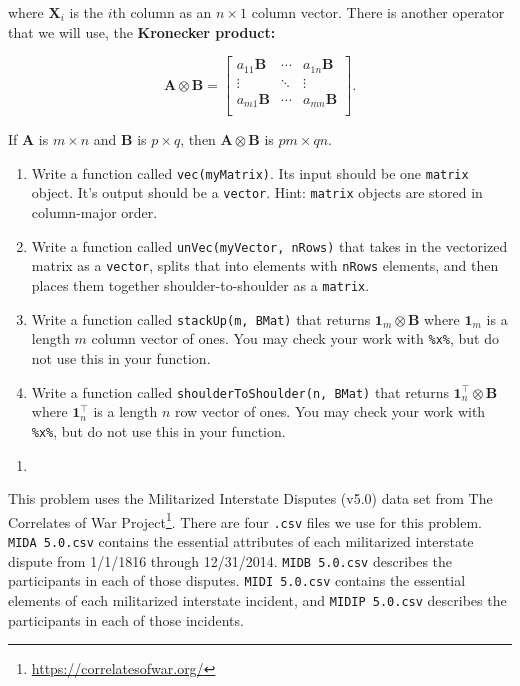 \documentclass[
  12pt,
  krantz2]{krantz}
\providecommand{\tightlist}{%
  \setlength{\itemsep}{0pt}\setlength{\parskip}{0pt}}
\renewcommand{\href}[2]{#2\footnote{\url{#1}}}
\begin{document}
where \(\mathbf{X}_i\) is the \(i\)th column as an \(n \times 1\) column vector. There is another operator that we will use, the \textbf{Kronecker product:}

\begin{equation} 
\mathbf{A} \otimes \mathbf{B} = 
\begin{bmatrix}
a_{11} \mathbf{B} & \cdots & a_{1n} \mathbf{B} \\
\vdots & \ddots & \vdots \\
a_{m1} \mathbf{B} & \cdots & a_{mn} \mathbf{B} \\
\end{bmatrix}.
\end{equation}

If \(\mathbf{A}\) is \(m \times n\) and \(\mathbf{B}\) is \(p \times q\), then \(\mathbf{A} \otimes \mathbf{B}\) is \(pm \times qn\).

\begin{enumerate}
\def\labelenumi{\alph{enumi})}
\tightlist
\item
  Write a function called \texttt{vec(myMatrix)}. Its input should be one \texttt{matrix} object. It's output should be a \texttt{vector}. Hint: \texttt{matrix} objects are stored in column-major order.
\item
  Write a function called \texttt{unVec(myVector,\ nRows)} that takes in the vectorized matrix as a \texttt{vector}, splits that into elements with \texttt{nRows} elements, and then places them together shoulder-to-shoulder as a \texttt{matrix}.
\item
  Write a function called \texttt{stackUp(m,\ BMat)} that returns \(\mathbf{1}_m \otimes \mathbf{B}\) where \(\mathbf{1}_m\) is a length \(m\) column vector of ones. You may check your work with \texttt{\%x\%}, but do not use this in your function.
\item
  Write a function called \texttt{shoulderToShoulder(n,\ BMat)} that returns \(\mathbf{1}^\intercal_n \otimes \mathbf{B}\) where \(\mathbf{1}_n^\intercal\) is a length \(n\) row vector of ones. You may check your work with \texttt{\%x\%}, but do not use this in your function.
\end{enumerate}

\begin{enumerate}
\def\labelenumi{\arabic{enumi}.}
\setcounter{enumi}{3}
\tightlist
\item
\end{enumerate}

This problem uses the Militarized Interstate Disputes (v5.0) \citep{mid5} data set from \href{https://correlatesofwar.org/}{The Correlates of War Project}. There are four \texttt{.csv} files we use for this problem. \texttt{MIDA\ 5.0.csv} contains the essential attributes of each militarized interstate dispute from 1/1/1816 through 12/31/2014. \texttt{MIDB\ 5.0.csv} describes the participants in each of those disputes. \texttt{MIDI\ 5.0.csv} contains the essential elements of each militarized interstate incident, and \texttt{MIDIP\ 5.0.csv} describes the participants in each of those incidents.
\end{document}
